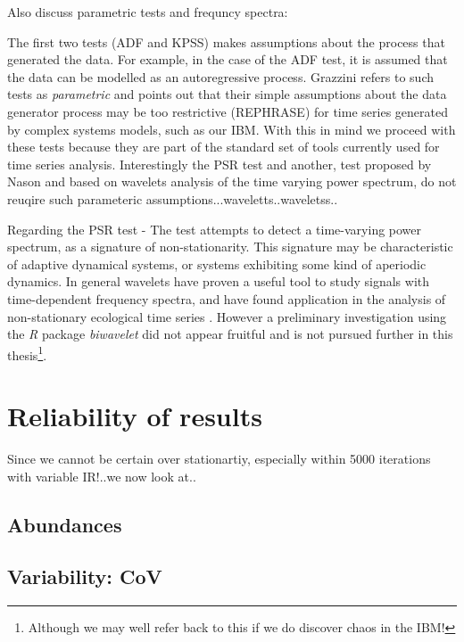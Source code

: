 Also discuss parametric tests and frequncy spectra:

The first two tests (ADF and KPSS) makes assumptions about the process that generated the data. For example, in the case of the ADF test, it is assumed that the data can be modelled as an autoregressive process. Grazzini \cite{grazzini2012analysis} refers to such tests as \emph{parametric} and points out that their simple assumptions about the data generator process may be too restrictive (REPHRASE) for time series generated by complex systems models, such as our IBM.  With this in mind we proceed with these tests because they are part of the standard set of tools currently used for time series analysis. Interestingly the PSR test and another, test proposed by Nason \cite{nason2013test} and based on wavelets analysis of the time varying power spectrum, do not reuqire such parameteric assumptions...waveletts..waveletss..

Regarding the PSR test - The test attempts to detect a time-varying power spectrum, as a signature of non-stationarity. This signature may be characteristic of adaptive dynamical systems, or systems exhibiting some kind of aperiodic dynamics. In general wavelets have proven a useful tool to study signals with time-dependent frequency spectra, and have found application in the analysis of non-stationary ecological time series \cite{cazelles2008wavelet, nason2013test}. However a preliminary investigation using the \emph{R} package \emph{biwavelet} did not appear fruitful and is not pursued further in this thesis\footnote{Although we may well refer back to this if we do discover chaos in the IBM!}. 





\section{Reliability of results}
\label{sec:reliability}

Since we cannot be certain over stationartiy, especially within 5000 iterations with variable IR!..we now look at..

\subsection{Abundances}
\subsection{Variability: CoV}

